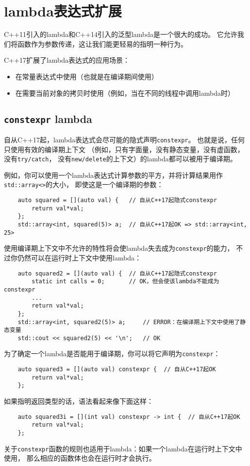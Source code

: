 \chapter{lambda表达式扩展}\label{ch6}
C++11引入的lambda和C++14引入的泛型lambda是一个很大的成功。
它允许我们将函数作为参数传递，这让我们能更轻易的指明一种行为。

C++17扩展了lambda表达式的应用场景：
\begin{itemize}
    \item 在常量表达式中使用（也就是在编译期间使用）
    \item 在需要当前对象的拷贝时使用（例如，当在不同的线程中调用lambda时）
\end{itemize}


\section{\texttt{constexpr} lambda}
自从C++17起，lambda表达式会尽可能的隐式声明\texttt{constexpr}。
也就是说，任何只使用有效的编译期上下文
（例如，只有字面量，没有静态变量，没有虚函数，没有\texttt{try/catch}，
没有\texttt{new/delete}的上下文）的lambda都可以被用于编译期。

例如，你可以使用一个lambda表达式计算参数的平方，并将计算结果用作\texttt{std::array<>}的大小，
即使这是一个编译期的参数：
\begin{lstlisting}
    auto squared = [](auto val) {   // 自从C++17起隐式constexpr
        return val*val;
    };
    std::array<int, squared(5)> a;  // 自从C++17起OK => std::array<int, 25>
\end{lstlisting}
使用编译期上下文中不允许的特性将会使lambda失去成为\texttt{constexpr}的能力，
不过你仍然可以在运行时上下文中使用lambda：
\begin{lstlisting}
    auto squared2 = [](auto val) {  // 自从C++17起隐式constexpr
        static int calls = 0;       // OK，但会使该lambda不能成为constexpr
        ...
        return val*val;
    };
    std::array<int, squared2(5)> a;     // ERROR：在编译期上下文中使用了静态变量
    std::cout << squared2(5) << '\n';   // OK
\end{lstlisting}
为了确定一个lambda是否能用于编译期，你可以将它声明为\texttt{constexpr}：
\begin{lstlisting}
    auto squared3 = [](auto val) constexpr {  // 自从C++17起OK
        return val*val;
    };
\end{lstlisting}
如果指明返回类型的话，语法看起来像下面这样：
\begin{lstlisting}
    auto squared3i = [](int val) constexpr -> int {  // 自从C++17起OK
        return val*val;
    };
\end{lstlisting}
关于\texttt{constexpr}函数的规则也适用于lambda：如果一个lambda在运行时上下文中使用，
那么相应的函数体也会在运行时才会执行。

